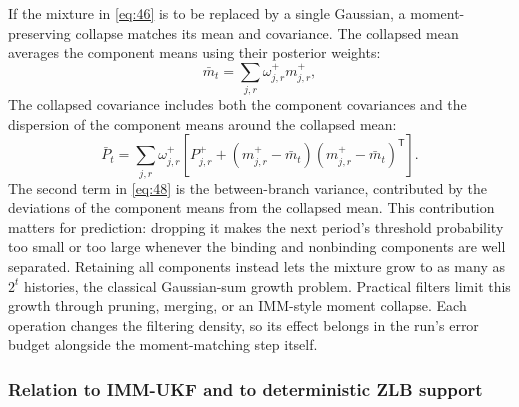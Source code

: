 \documentclass[11pt]{article}
\begin{document}
If the mixture in \eqref{eq:46} is to be replaced by a single Gaussian, a moment-preserving collapse matches its mean and covariance. The collapsed mean averages the component means using their posterior weights:
\begin{equation}\label{eq:47}
 \bar m_t=\sum_{j,r}\omega^+_{j,r}m^+_{j,r},
\end{equation}
The collapsed covariance includes both the component covariances and the dispersion of the component means around the collapsed mean:
\begin{equation}\label{eq:48}
 \bar P_t=\sum_{j,r}\omega^+_{j,r}
 \left[P^+_{j,r}+
 (m^+_{j,r}-\bar m_t)(m^+_{j,r}-\bar m_t)^{\mathsf T}\right].
\end{equation}
The second term in \eqref{eq:48} is the between-branch variance, contributed by the deviations of the component means from the collapsed mean. This contribution matters for prediction: dropping it makes the next period's threshold probability too small or too large whenever the binding and nonbinding components are well separated. Retaining all components instead lets the mixture grow to as many as $2^t$ histories, the classical Gaussian-sum growth problem. Practical filters limit this growth through pruning, merging, or an IMM-style moment collapse. Each operation changes the filtering density, so its effect belongs in the run's error budget alongside the moment-matching step itself.

\subsubsection{Relation to IMM-UKF and to deterministic ZLB support}
\label{sec:ukf-imm}
\end{document}
